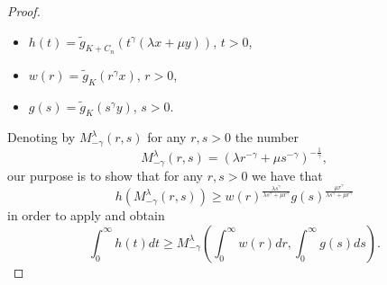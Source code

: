 \documentclass[10pt]{amsart}
\numberwithin{equation}{section}
\begin{document}
\begin{proof}
\begin{itemize}
\item $h(t)=\tilde{g}_{K+C_n}(t^\gamma(\lambda x+\mu y))$, $t> 0$,
\item $w(r)=\tilde{g}_K(r^\gamma x)$, $r> 0$,
\item $g(s)=\tilde{g}_K(s^\gamma y)$, $s>0$.
\end{itemize}
Denoting by $M_{-\gamma}^\lambda(r,s)$ for any $r,s>0$ the number
$$
M_{-\gamma}^\lambda(r,s)=(\lambda r^{-\gamma}+\mu s^{-\gamma})^{-\frac{1}{\gamma}},
$$
our purpose is to show that for any $r,s>0$ we have that
\begin{equation}\label{eq:inequalityMeans}
h(M_{-\gamma}^\lambda(r,s))\geq w(r)^{\frac{\lambda s^\gamma}{\lambda s^\gamma+\mu r^\gamma}}g(s)^{\frac{\mu r^\gamma}{\lambda s^\gamma+\mu r^\gamma}}
\end{equation}
in order to apply \cite[Theorem 2.5.4]{BGVV} and obtain
\begin{equation}\label{eq:InequalityIntegrals}
\int_0^\infty h(t)dt\geq M_{-\gamma}^\lambda\left(\int_0^\infty w(r)dr,\int_0^\infty g(s)ds\right).
\end{equation}


\end{proof}
\end{document}
